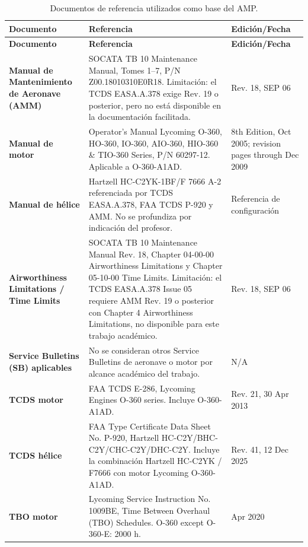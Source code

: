 \documentclass[12pt]{article}
\begin{document}
\begin{longtable}{|>{\raggedright\arraybackslash}p{}|>{\raggedright\arraybackslash}p{}|>{\raggedright\arraybackslash}p{}|}
\caption{Documentos de referencia utilizados como base del AMP.}
\label{tab:documentos-referencia}\\
\hline
\textbf{Documento} & \textbf{Referencia} & \textbf{Edición/Fecha} \\
\hline
\endfirsthead
\hline
\textbf{Documento} & \textbf{Referencia} & \textbf{Edición/Fecha} \\
\hline
\endhead
\textbf{Manual de Mantenimiento de Aeronave (AMM)} & SOCATA TB 10 Maintenance Manual, Tomes 1--7, P/N Z00.18010310E0R18. Limitación: el TCDS EASA.A.378 exige Rev. 19 o posterior, pero no está disponible en la documentación facilitada. & Rev. 18, SEP 06 \\
\hline
\textbf{Manual de motor} & Operator's Manual Lycoming O-360, HO-360, IO-360, AIO-360, HIO-360 \& TIO-360 Series, P/N 60297-12. Aplicable a O-360-A1AD. & 8th Edition, Oct 2005; revision pages through Dec 2009 \\
\hline
\textbf{Manual de hélice} & Hartzell HC-C2YK-1BF/F 7666 A-2 referenciada por TCDS EASA.A.378, FAA TCDS P-920 y AMM. No se profundiza por indicación del profesor. & Referencia de configuración \\
\hline
\textbf{Airworthiness Limitations / Time Limits} & SOCATA TB 10 Maintenance Manual Rev. 18, Chapter 04-00-00 Airworthiness Limitations y Chapter 05-10-00 Time Limits. Limitación: el TCDS EASA.A.378 Issue 05 requiere AMM Rev. 19 o posterior con Chapter 4 Airworthiness Limitations, no disponible para este trabajo académico. & Rev. 18, SEP 06 \\
\hline
\textbf{Service Bulletins (SB) aplicables} & No se consideran otros Service Bulletins de aeronave o motor por alcance académico del trabajo. & N/A \\
\hline
\textbf{TCDS motor} & FAA TCDS E-286, Lycoming Engines O-360 series. Incluye O-360-A1AD. & Rev. 21, 30 Apr 2013 \\
\hline
\textbf{TCDS hélice} & FAA Type Certificate Data Sheet No. P-920, Hartzell HC-C2Y/BHC-C2Y/CHC-C2Y/DHC-C2Y. Incluye la combinación Hartzell HC-C2YK / F7666 con motor Lycoming O-360-A1AD. & Rev. 41, 12 Dec 2025 \\
\hline
\textbf{TBO motor} & Lycoming Service Instruction No. 1009BE, Time Between Overhaul (TBO) Schedules. O-360 except O-360-E: 2000 h. & 24 Apr 2020 \\
\hline
\end{longtable}
\endgroup
\end{document}

